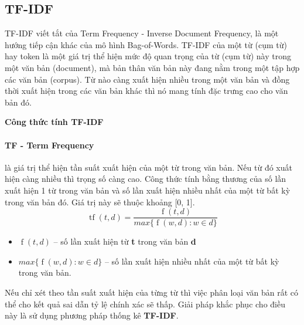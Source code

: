 \documentclass[12pt,a4paper,oneside]{book}
\begin{document}
	\subsection{TF-IDF}
	

			
			TF-IDF viết tắt của Term Frequency - Inverse Document Frequency, là một hướng tiếp cận khác của mô hình Bag-of-Words. TF-IDF của một từ (cụm từ) hay token là một giá trị thể hiện mức độ quan trọng của từ (cụm từ) này trong một văn bản (document), mà bản thân văn bản này đang nằm trong một tập hợp các văn bản (corpus). Từ nào càng xuất hiện nhiều trong một văn bản và đồng thời xuất hiện trong các văn bản khác thì nó mang tính đặc trưng cao cho văn bản đó.
	
			\textbf{Công thức tính TF-IDF}
			 \paragraph{TF - Term Frequency}
			là giá trị thể hiện tần suất xuất hiện của một từ trong văn bản. Nếu từ đó xuất hiện càng nhiều thì trọng số càng cao. Công thức tính bằng thương của số lần xuất hiện 1 từ trong văn bản và số lần xuất hiện nhiều nhất của một từ bất kỳ trong văn bản đó. Giá trị này sẽ thuộc khoảng [0, 1].
			\begin{equation}
				\operatorname{tf}(t, d)= \frac{\operatorname{f}(t,d)}{max\{\operatorname{f}(w,d) : w \in d \}}
			\end{equation}
		 	\begin{itemize}
		 		\item \textbf{$\operatorname{f}(t,d)$} – số lần xuất hiện từ \textbf{t} trong văn bản \textbf{d}
		 		\item \textbf{$max\{\operatorname{f}(w,d) : w \in d \}$} – số lần xuất hiện nhiều nhất của một từ bất kỳ trong văn bản.
		 	\end{itemize}
		 	
	 		 Nếu chỉ xét theo tần suất xuất hiện của từng từ thì việc phân loại văn bản rất có thể cho kết quả sai dẫn tỷ lệ chính xác sẽ thấp. Giải pháp khắc phục cho điều này là sử dụng phương pháp thống kê \textbf{TF-IDF}.
\end{document}
